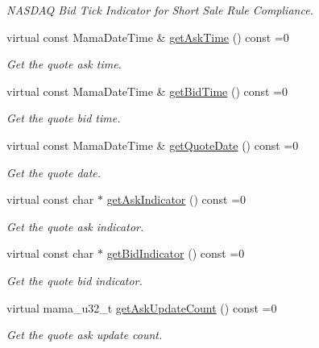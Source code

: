 \begin{CompactItemize}
\begin{CompactList}\small\item\em NASDAQ Bid Tick Indicator for Short Sale Rule Compliance. \item\end{CompactList}\item 
virtual const Mama\-Date\-Time \& \hyperlink{classWombat_1_1MamdaQuoteRecap_4d1e7288ed0a726a23f66aa9ed212afa}{get\-Ask\-Time} () const =0
\begin{CompactList}\small\item\em Get the quote ask time. \item\end{CompactList}\item 
virtual const Mama\-Date\-Time \& \hyperlink{classWombat_1_1MamdaQuoteRecap_42016fe76b884a22fb769c3eceac39ad}{get\-Bid\-Time} () const =0
\begin{CompactList}\small\item\em Get the quote bid time. \item\end{CompactList}\item 
virtual const Mama\-Date\-Time \& \hyperlink{classWombat_1_1MamdaQuoteRecap_1400aa5f7ac60907d95f07fb3fd2192b}{get\-Quote\-Date} () const =0
\begin{CompactList}\small\item\em Get the quote date. \item\end{CompactList}\item 
virtual const char $\ast$ \hyperlink{classWombat_1_1MamdaQuoteRecap_f2cd889d5838aa3204784eb57e447d4e}{get\-Ask\-Indicator} () const =0
\begin{CompactList}\small\item\em Get the quote ask indicator. \item\end{CompactList}\item 
virtual const char $\ast$ \hyperlink{classWombat_1_1MamdaQuoteRecap_91a0dbca4e481e0e3179af813128fba9}{get\-Bid\-Indicator} () const =0
\begin{CompactList}\small\item\em Get the quote bid indicator. \item\end{CompactList}\item 
virtual mama\_\-u32\_\-t \hyperlink{classWombat_1_1MamdaQuoteRecap_99ae27dd8ca7ed8507afcc66cdfe0f1c}{get\-Ask\-Update\-Count} () const =0
\begin{CompactList}\small\item\em Get the quote ask update count. \item\end{CompactList}\item 

\end{CompactItemize}
